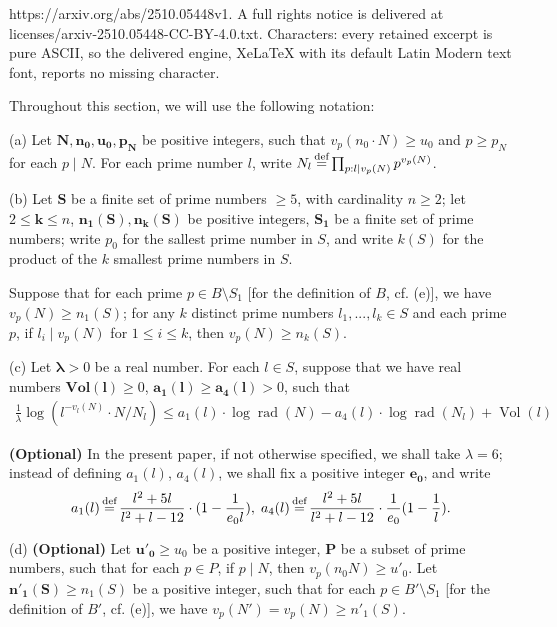 \documentclass[10pt,a4paper]{amsart}
\DeclareMathOperator{\Vol}{\text{Vol}}
\DeclareMathOperator{\defeq}{\overset{\text{\tiny{def}}}{=}}
\DeclareMathOperator{\rad}{\text{rad}}
\begin{document}
https://arxiv.org/abs/2510.05448v1. A full rights notice is delivered at licenses/arxiv-2510.05448-CC-BY-4.0.txt. Characters: every retained excerpt is pure ASCII, so the delivered engine, XeLaTeX with its default Latin Modern text font, reports no missing character.
\begin{definition} \label{1-3-def: basic notation for global inequalities}
Throughout this section, we will use the following notation:

(a) Let $\boldsymbol{N, n_0, u_0, p_N}$ be positive integers, such that $v_p(n_0 \cdot N)\ge u_0$ and $p \ge p_N$ for each $p\mid N$.
For each prime number $l$, write $N_l \defeq \prod_{p:l\mid v_p(N)} p^{v_p(N)}$.

(b) Let $\boldsymbol{S}$ be a finite set of prime numbers $\ge 5$, with cardinality $n \ge 2$; 
let $2 \le \boldsymbol{k} \le n$, $\boldsymbol{n_1(S), n_k(S)}$ be positive integers, $\boldsymbol{S_1}$ be a finite set of prime numbers;
write $p_0$ for the sallest prime number in $S$, and write $k(S)$ for the product of the $k$ smallest prime numbers in $S$. 

Suppose that for each prime $p\in B\setminus S_1$ [for the definition of $B$, cf. (e)], we have $v_p(N) \ge n_1(S)$;
 for any $k$ distinct prime numbers $l_1, ..., l_k \in S$ and each prime $p$, if $l_i \mid v_p(N)$ for $1\le i\le k$, then $v_p(N) \ge n_k(S)$.

(c) Let $\boldsymbol{\lambda} > 0$ be a real number. For each $l\in S$, suppose that we have real numbers $\boldsymbol{\textbf{Vol}(l)} \ge 0$, $\boldsymbol{a_1(l)} \ge \boldsymbol{a_4(l)} > 0$, such that 
\small\begin{align} \label{1-1-eq1}
\frac{1}{\lambda}\log(l^{-v_l(N)} \cdot N/N_l  ) \le  a_1(l) \cdot \log\rad(N) - a_4(l) \cdot \log\rad(N_l) + \Vol(l)
\end{align}\normalsize

\textbf{(Optional)} In the present paper, if not otherwise specified, we shall take $\lambda = 6$; instead of defining $a_1(l)$, $a_4(l)$, we shall fix a positive integer $\boldsymbol{e_0}$, and write 
\begin{gather*}
a_1(l) \defeq \frac{l^2+5l}{l^2+l-12}\cdot  (1-\frac{1}{e_0  l}), \;
a_4(l) \defeq \frac{l^2+5l}{l^2+l-12}\cdot \frac{1}{e_0}(1- \frac{1}{l}) .
\end{gather*}


(d) \textbf{(Optional)} Let $\boldsymbol{u'_0}\ge u_0$ be a positive integer, $\boldsymbol{P}$ be a subset of prime numbers, such that for each $p\in P$, if $p\mid N$, then $v_p(n_0N)\ge u'_0$.
Let $\boldsymbol{n'_1(S)} \ge n_1(S)$ be a positive integer, such that for each $p\in B' \setminus S_1$ [for the definition of $B'$, cf. (e)], we have $v_p(N') = v_p(N) \ge n'_1(S)$.


\end{definition}
\end{document}
